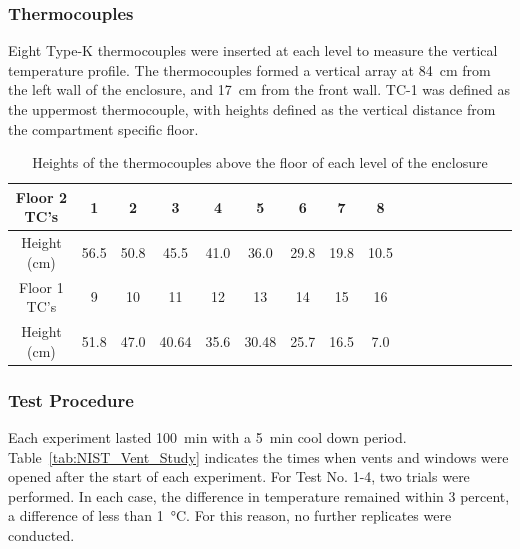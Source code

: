 \subsubsection{Thermocouples}

Eight Type-K thermocouples were inserted at each level to measure the vertical temperature profile. The thermocouples formed a vertical array at 84~cm from the left wall of the enclosure, and 17~cm from the front wall. TC-1 was defined as the uppermost thermocouple, with heights defined as the vertical distance from the compartment specific floor.

\begin{table}[h!]
\centering
\caption[Heights of the thermocouples above the floor]{Heights of the thermocouples above the floor of each level of the enclosure}
\begin{tabular}{|c|c|c|c|c|c|c|c|c|c|c|c|c|c|c|c|c|}
\hline
Floor 2 TC's   & 1& 2& 3 & 4& 5& 6& 7&8\\ \hline
Height (cm) & 56.5& 50.8& 45.5& 41.0& 36.0& 29.8& 19.8& 10.5\\ \hline
Floor 1 TC's & 9&10&11&12&13&14&15&16\\ \hline
Height (cm) &51.8&47.0&40.64&35.6&30.48&25.7& 16.5&7.0\\ \hline
\end{tabular}
\label{Tab.TC}
\end{table}

\subsubsection{Test Procedure}

Each experiment lasted 100~min with a 5~min cool down period. Table~\ref{tab:NIST_Vent_Study} indicates the times when vents and windows were opened after the start of each experiment. For Test No. 1-4, two trials were performed. In each case, the difference in temperature remained within 3 percent, a difference of less than 1~\unit{\degreeCelsius}. For this reason, no further replicates were conducted.


